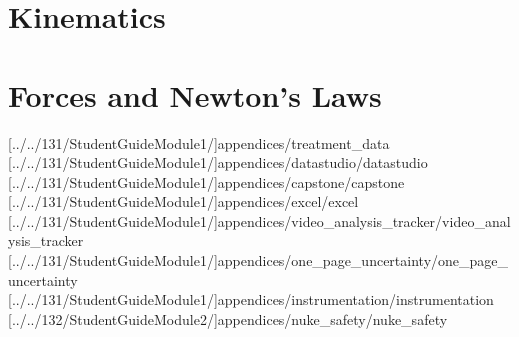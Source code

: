 \documentclass[english,twoside]{article}
\begin{document}


\setcounter{tocdepth}{1}\tableofcontents{}
\cleardoublepage
\renewcommand{\headersupplementmark}{Lab }


\part{Kinematics}

\part{Forces and Newton's Laws}




\appendix
{} %
\cleardoublepage
\NoForceSectionOddPage %
\renewcommand{\headersupplementmark}{Appendix }
\titleformat{\section}{\normalfont\large\bfseries}{\headersupplementmark \thesection :}{1ex}{}

[../../131/StudentGuideModule1/]{appendices/treatment_data}
[../../131/StudentGuideModule1/]{appendices/datastudio/datastudio}
[../../131/StudentGuideModule1/]{appendices/capstone/capstone}
[../../131/StudentGuideModule1/]{appendices/excel/excel}
[../../131/StudentGuideModule1/]{appendices/video_analysis_tracker/video_analysis_tracker}
[../../131/StudentGuideModule1/]{appendices/one_page_uncertainty/one_page_uncertainty}
[../../131/StudentGuideModule1/]{appendices/instrumentation/instrumentation}
[../../132/StudentGuideModule2/]{appendices/nuke_safety/nuke_safety}
\end{document}
